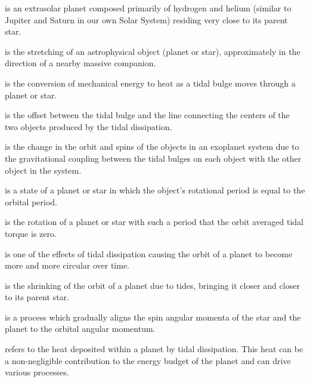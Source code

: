 \begin{glossary}

     is an extrasolar planet composed primarily of hydrogen
    and helium (similar to Jupiter and Saturn in our own Solar System) residing
    very close to its parent star.

     is the stretching of an astrophysical object (planet or
    star), approximately in the direction of a nearby massive companion.

     is the conversion of mechanical energy to heat as
    a tidal bulge moves through a planet or star.

     is the offset between the tidal bulge and the line
    connecting the centers of the two objects produced by the tidal dissipation.

     is the change in the orbit and spins of the objects
    in an exoplanet system due to the gravitational coupling between the tidal
    bulges on each object with the other object in the system.

     is a state of a planet or star in which the
    object's rotational period is equal to the orbital period.

     is the rotation of a planet or star with
    such a period that the orbit averaged tidal torque is zero.

     is one of the effects of tidal dissipation
    causing the orbit of a planet to become more and more circular over time.

     is the shrinking of the orbit of a planet due to
    tides, bringing it closer and closer to its parent star.

     is a process which gradually aligns the spin angular
    momenta of the star and the planet to the orbital angular momentum.

     refers to the heat deposited within a planet by tidal
    dissipation. This heat can be a non-negligible contribution to the energy
    budget of the planet and can drive various processes.

\end{glossary}
